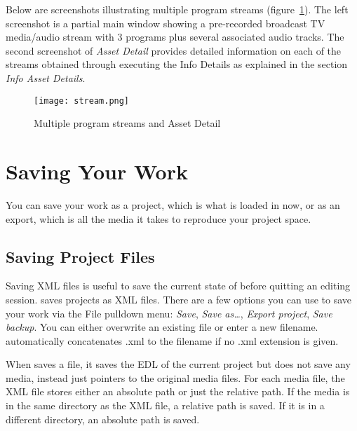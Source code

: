 Below are screenshots illustrating multiple program streams (figure~\ref{fig:stream}).  The left screenshot is a partial main \CGG{} window showing a pre-recorded broadcast TV media/audio stream with 3 programs plus several associated audio tracks.  The second screenshot of \textit{Asset Detail} provides detailed information on each of the streams obtained through executing the Info Details as explained in the section \textit{Info Asset Details}.

\begin{figure}[htpb]
    \centering
    \texttt{[image: stream.png]}
    \caption{Multiple program streams and Asset Detail}
    \label{fig:stream}
\end{figure}

\section{Saving Your Work}%
\label{sec:saving_your_work}

You can save your work as a project, which is what is loaded in \CGG{} now, or as an export, which is all the media it takes to reproduce your project space.

\subsection{Saving Project Files}%
\label{sub:saving_project_files}

Saving  XML files is useful to save the current state of \CGG{} before quitting an editing session. \CGG{} saves projects as XML files. There are a few options you can use to save your work via the File pulldown menu: \textit{Save}, \textit{Save as\dots}, \textit{Export project}, \textit{Save backup}.  You can either overwrite an existing file or enter a new filename. \CGG{} automatically concatenates .xml to the filename if no .xml extension is given.

When \CGG{} saves a file, it saves the EDL of the current project but does not save any media, instead just pointers to the original media files. For each media file, the XML file stores either an absolute path or just the relative path. If the media is in the same directory as the XML file, a relative path is saved. If it is in a different directory, an absolute path is saved.

